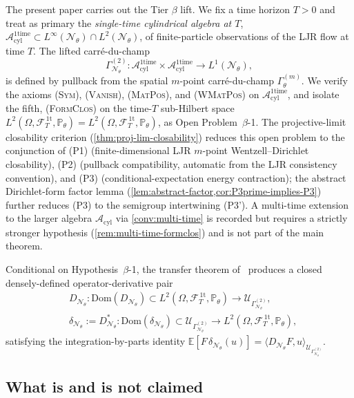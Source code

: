 \documentclass[11pt,reqno]{amsart}
\theoremstyle{plain}
\theoremstyle{definition}
\theoremstyle{remark}
\newcommand{\E}{\mathbb E}
\newcommand{\Prob}{\mathbb P}
\newcommand{\Dom}{\mathrm{Dom}}
\newcommand{\cA}{\mathcal A}
\newcommand{\cF}{\mathcal F}
\newcommand{\cN}{\mathcal N}
\newcommand{\cU}{\mathcal U}
\newcommand{\Acyl}{\cA_{\mathrm{cyl}}}
\newcommand{\Aone}{\cA_{\mathrm{cyl}}^{\mathrm{1time}}}
\newcommand{\FT}{\cF_{T}^{\,\mathrm{1t}}}
\newcommand{\Hone}{L^{2}(\Omega,\FT,\Pth)}
\newcommand{\GamN}{\Gamma^{(2)}_{\cN_{\theta}}}
\newcommand{\GamM}[1]{\Gamma^{(#1)}_{\theta}}
\newcommand{\DN}{D_{\cN_{\theta}}}
\newcommand{\divN}{\delta_{\cN_{\theta}}}
\newcommand{\Pth}{\Prob_{\theta}}
\begin{document}
The present paper carries out the Tier $\beta$ lift. We fix a time
horizon $T>0$ and treat as primary the \emph{single-time cylindrical
algebra at $T$},
$\Aone\subset L^{\infty}(\cN_{\theta})\cap L^{2}(\cN_{\theta})$, of
finite-particle observations of the LJR flow at time $T$. The
lifted carr\'e-du-champ
\begin{equation}\label{eq:lifted-Gamma-intro}
  \GamN\colon\Aone\times\Aone\longrightarrow L^{1}(\cN_{\theta}),
\end{equation}
is defined by pullback from the spatial $m$-point carr\'e-du-champ
$\GamM{m}$. We verify the axioms {\normalfont\textsc{(Sym)}},
{\normalfont\textsc{(Vanish)}}, {\normalfont\textsc{(MatPos)}}, and
{\normalfont\textsc{(WMatPos)}} on $\Aone$, and isolate the fifth,
{\normalfont\textsc{(FormClos)}} on the time-$T$ sub-Hilbert space
$\Hone=L^{2}(\Omega,\FT,\Pth)$, as Open Problem~$\beta$-1. The
projective-limit closability criterion
(\cref{thm:proj-lim-closability}) reduces this open problem to
the conjunction of {\normalfont (P1)} (finite-dimensional LJR
$m$-point Wentzell--Dirichlet closability), {\normalfont (P2)}
(pullback compatibility, automatic from the LJR consistency
convention), and {\normalfont (P3)} (conditional-expectation energy
contraction); the abstract Dirichlet-form factor lemma
(\cref{lem:abstract-factor,cor:P3prime-implies-P3}) further
reduces {\normalfont (P3)} to the semigroup intertwining
{\normalfont (P3')}. A multi-time extension to the larger algebra
$\Acyl$ via \cref{conv:multi-time} is recorded but requires a
strictly stronger hypothesis (\cref{rem:multi-time-formclos}) and
is not part of the main theorem.

Conditional on Hypothesis~$\beta$-1, the transfer theorem
of~\cite{GammaHierarchyDivergence} produces a closed densely-defined
operator-derivative pair
\begin{align*}
  &\DN\colon\Dom(\DN)\subset\Hone\longrightarrow\cU_{\GamN},\\
  &\divN:=\DN^{*}\colon\Dom(\divN)\subset\cU_{\GamN}\longrightarrow\Hone,
\end{align*}
satisfying the integration-by-parts identity
$\E[F\,\divN(u)]=\langle\DN F,u\rangle_{\cU_{\GamN}}$.

\subsection{What is and is not claimed}\label{sec:intro-claims}
\end{document}
